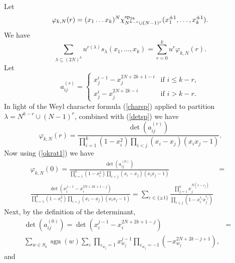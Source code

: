 \documentclass[11pt]{amsart}
\newcommand{\tmop}[1]{\ensuremath{\operatorname{#1}}}
\renewcommand{\sp}{{\rm sp}}
\begin{document}
Let
$$\varphi_{k, N}(r) = (x_1 \dots x_k)^N \chi_{N^{k-r}
\cup (N-1)^r}^{\sp_{2k}}(x_1^{\pm 1}, \dots, x_k^{\pm 1}).$$ We
have
\begin{equation}
  \label{e:phi0} \sum_{\lambda \subseteq ( 2 N )^k} u^{r ( \lambda )}
  s_{\lambda} ( x_1, \ldots, x_k ) = \sum_{r = 0}^k u^r \varphi_{k, N} ( r ) .
\end{equation}
Let
\[ a_{ij}^{( r )} = \left\{\begin{array}{ll}
     x_j^{i - 1} - x_j^{2 N + 2 k + 1 - i} & \text{if $i \leqslant k - r$},\\
     x_j^i - x_j^{2 N + 2 k - i} & \text{if $i > k - r$} .
   \end{array}\right. \]
In light of the Weyl character formula (\ref{charsp}) applied to
partition $\lambda = N^{k - r} \cup ( N - 1 )^r$, combined with
(\ref{detsp}) we have
\begin{equation}
  \label{e:phi} \varphi_{k, N} ( r ) = \frac{\det ( a_{ij}^{( r )} )}{\prod_{i
  = 1}^k ( 1 - x^2_i ) \prod_{i < j} ( x_i - x_j ) ( x_i x_j - 1 )} .
\end{equation}
Now using (\ref{okrat1}) we have
\begin{eqnarray}
  \label{e:phibis}
\varphi_{k, N} ( 0 ) = \frac{\det ( a_{ij}^{( 0 )} )}{\prod_{i =
1}^k ( 1 -
  x^2_i ) \prod_{i < j} ( x_i - x_j ) ( x_i x_j - 1 )} & = & \\
  \frac{\det ( x_i^{j - 1} - x_i^{2 N + 2 k + 1 - j} )}{\prod_{i = 1}^k ( 1 -
  x^2_i ) \prod_{i < j} ( x_i - x_j ) ( x_i x_j - 1 )} = \sum_{\varepsilon \in
  \{ \pm 1 \}} \frac{\prod_{j = 1}^k x_j^{N ( 1 - \varepsilon_j )}}{\prod_{i
  \leqslant j} ( 1 - x_i^{\varepsilon_i} x_j^{\varepsilon_j} )} &  &
   \nonumber
\end{eqnarray}
Next, by the definition of the determinant,
\begin{eqnarray}
  \det ( a_{ij}^{( 0 )} ) = \det ( x_i^{j - 1} - x_i^{2 N + 2 k + 1 - j} ) & =
  &  \nonumber\\
  \sum_{w \in S_k} \tmop{sgn} ( w ) \sum_{\varepsilon}
  \prod_{\varepsilon_{w_j} = 1} x_{w_j}^{j - 1} \prod_{\varepsilon_{w_j} = -
  1} ( - x_{w_j}^{2 N + 2 k - j + 1} ), &  &  \label{e:phi1}
\end{eqnarray}
and
\end{document}
